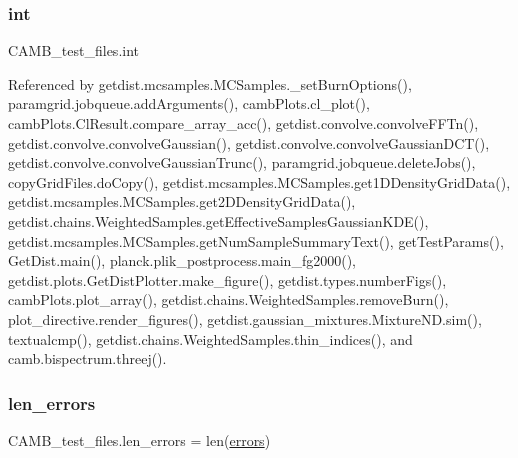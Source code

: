 \subsubsection{\texorpdfstring{int}{int}}
{\footnotesize\ttfamily C\+A\+M\+B\+\_\+test\+\_\+files.\+int}



Referenced by getdist.\+mcsamples.\+M\+C\+Samples.\+\_\+set\+Burn\+Options(), paramgrid.\+jobqueue.\+add\+Arguments(), camb\+Plots.\+cl\+\_\+plot(), camb\+Plots.\+Cl\+Result.\+compare\+\_\+array\+\_\+acc(), getdist.\+convolve.\+convolve\+F\+F\+Tn(), getdist.\+convolve.\+convolve\+Gaussian(), getdist.\+convolve.\+convolve\+Gaussian\+D\+C\+T(), getdist.\+convolve.\+convolve\+Gaussian\+Trunc(), paramgrid.\+jobqueue.\+delete\+Jobs(), copy\+Grid\+Files.\+do\+Copy(), getdist.\+mcsamples.\+M\+C\+Samples.\+get1\+D\+Density\+Grid\+Data(), getdist.\+mcsamples.\+M\+C\+Samples.\+get2\+D\+Density\+Grid\+Data(), getdist.\+chains.\+Weighted\+Samples.\+get\+Effective\+Samples\+Gaussian\+K\+D\+E(), getdist.\+mcsamples.\+M\+C\+Samples.\+get\+Num\+Sample\+Summary\+Text(), get\+Test\+Params(), Get\+Dist.\+main(), planck.\+plik\+\_\+postprocess.\+main\+\_\+fg2000(), getdist.\+plots.\+Get\+Dist\+Plotter.\+make\+\_\+figure(), getdist.\+types.\+number\+Figs(), camb\+Plots.\+plot\+\_\+array(), getdist.\+chains.\+Weighted\+Samples.\+remove\+Burn(), plot\+\_\+directive.\+render\+\_\+figures(), getdist.\+gaussian\+\_\+mixtures.\+Mixture\+N\+D.\+sim(), textualcmp(), getdist.\+chains.\+Weighted\+Samples.\+thin\+\_\+indices(), and camb.\+bispectrum.\+threej().

\mbox{\label{namespaceCAMB__test__files_a31a287a53762589e5f0d1b752e547c4a}} 
\subsubsection{\texorpdfstring{len\+\_\+errors}{len\_errors}}
{\footnotesize\ttfamily C\+A\+M\+B\+\_\+test\+\_\+files.\+len\+\_\+errors = len(\mbox{\hyperlink{namespaceCAMB__test__files_aed6dfae5d7772aeb01bdf0bc6ea2aff9}{errors}})}

\mbox{\label{namespaceCAMB__test__files_ac9ad1cb649c3984eee8d4f3cc182249c}} 
